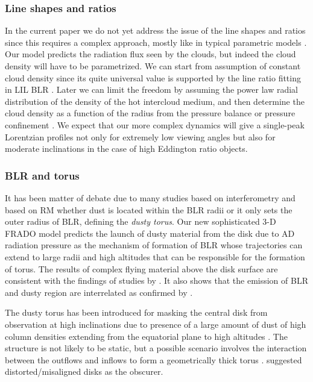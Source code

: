 \documentclass[twocolumn]{aastex62}
\begin{document}
\subsubsection{Line shapes and ratios}

In the current paper we do not yet address the issue of the line shapes and ratios since this requires a complex approach, mostly like in typical parametric models \citep[e.g.][]{pancoast2014}. Our model predicts the radiation flux seen by the clouds, but indeed the cloud density will have to be parametrized. We can start from assumption of constant cloud density since its quite universal value is supported by the line ratio fitting in LIL BLR \citep[e.g.][]{tek2016, panda2018, adhikari2019book}. Later we can limit the freedom by assuming the power law radial distribution of the density of the hot intercloud medium, and then determine the cloud density as a function of the radius from the pressure balance or pressure confinement \citep{rozanska2006,baskin2018}. We expect that our more complex dynamics will give a single-peak Lorentzian profiles not only for extremely low viewing angles \citep[e.g.][]{Goad2012} but also for moderate inclinations in the case of high Eddington ratio objects.

\subsubsection{BLR and torus}

It has been matter of debate due to many studies based on interferometry \citep[e.g.][]{clavel1989, Swain2003, Kishimoto2009, Pott2010, Kishimoto2011, Gravity2020} and based on RM \citep[e.g.][]{Suganuma2006, Koshida2014, Schnulle2015, Minezaki2019} whether dust is located within the BLR radii or it only sets the outer radius of BLR, defining the \emph{dusty torus}. Our new  sophisticated 3-D FRADO model predicts the launch of dusty material from the disk due to AD radiation pressure as the mechanism of formation of BLR whose trajectories can extend to large radii and high altitudes that can be responsible for the formation of torus. The results of complex flying material above the disk surface are consistent with the findings of studies by \citet{Goad2012, Figaredo2020}. It also shows that the emission of BLR and dusty region are interrelated as confirmed by \citet{Wang2013}.

The dusty torus has been introduced for masking the central disk from observation at high inclinations due to presence of a large amount of dust of high column densities extending from the equatorial plane to high altitudes \citep{antonucci1985}. The structure is not likely to be static, but a possible scenario involves the interaction between the outflows and inflows to form a geometrically thick torus \citep{wada2012}. \citet{Lawrence2010} suggested distorted/misaligned disks as the obscurer.
\end{document}
